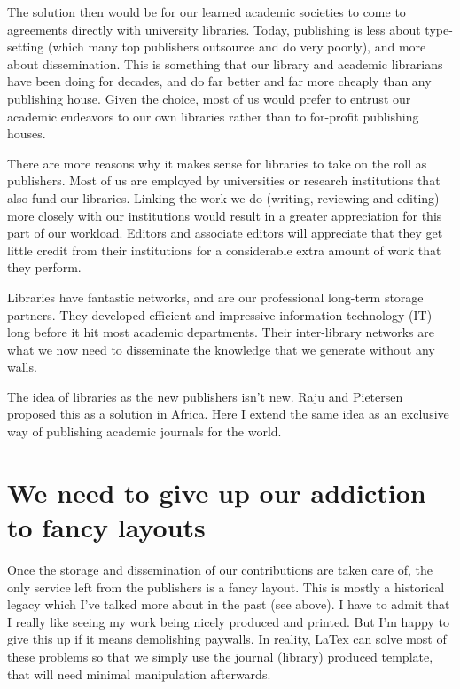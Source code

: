 \documentclass[
]{krantz}
\begin{document}
The solution then would be for our learned academic societies to come to agreements directly with university libraries. Today, publishing is less about type-setting (which many top publishers outsource and do very poorly), and more about dissemination. This is something that our library and academic librarians have been doing for decades, and do far better and far more cheaply than any publishing house. Given the choice, most of us would prefer to entrust our academic endeavors to our own libraries rather than to for-profit publishing houses.

There are more reasons why it makes sense for libraries to take on the roll as publishers. Most of us are employed by universities or research institutions that also fund our libraries. Linking the work we do (writing, reviewing and editing) more closely with our institutions would result in a greater appreciation for this part of our workload. Editors and associate editors will appreciate that they get little credit from their institutions for a considerable extra amount of work that they perform.

Libraries have fantastic networks, and are our professional long-term storage partners. They developed efficient and impressive information technology (IT) long before it hit most academic departments. Their inter-library networks are what we now need to disseminate the knowledge that we generate without any walls.

The idea of libraries as the new publishers isn't new. Raju and Pietersen \citep{raju2017library} proposed this as a solution in Africa. Here I extend the same idea as an exclusive way of publishing academic journals for the world.

\hypertarget{we-need-to-give-up-our-addiction-to-fancy-layouts}{%
\section{We need to give up our addiction to fancy layouts}\label{we-need-to-give-up-our-addiction-to-fancy-layouts}}

Once the storage and dissemination of our contributions are taken care of, the only service left from the publishers is a fancy layout. This is mostly a historical legacy which I've talked more about in the past (see above). I have to admit that I really like seeing my work being nicely produced and printed. But I'm happy to give this up if it means demolishing paywalls. In reality, LaTex can solve most of these problems so that we simply use the journal (library) produced template, that will need minimal manipulation afterwards.
\end{document}
